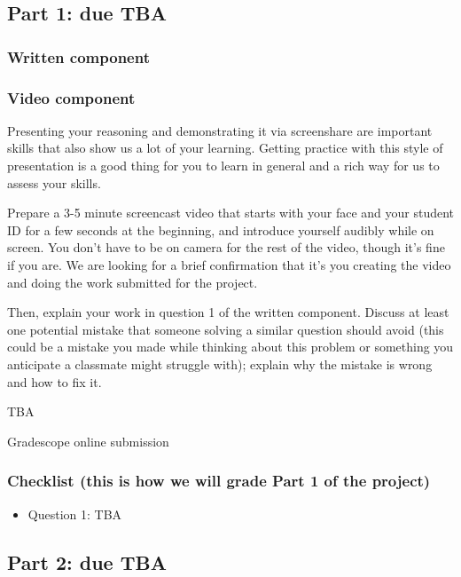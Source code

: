 \newpage
\subsection*{Part 1: due TBA}
\subsubsection*{Written component}


\subsubsection*{Video component}
Presenting your reasoning and demonstrating it via screenshare are important 
skills that also show us a lot of your learning. Getting practice with this style of 
presentation is a good thing for you to learn in general and a rich way for us to assess your skills. 

Prepare a 3-5 minute screencast video that starts with 
your face and your student ID for a few seconds at the beginning, and introduce yourself audibly while on screen. 
You don't have to be on camera for the rest of the video, though it's fine if you are. 
We are looking for a brief confirmation that it's you creating the video and doing the work 
submitted for the project.

Then, explain your work in question 1 of the written component.
Discuss at least one potential mistake that someone solving 
a similar question should avoid (this could be a mistake you made while thinking about this 
problem or something you anticipate a classmate might struggle with); explain why the 
mistake is wrong and how to fix it.
 
TBA

Gradescope online submission

\subsubsection*{Checklist (this is how we will grade Part 1 of the project)}
\begin{itemize}
\item Question 1: TBA
\end{itemize}

\newpage
\subsection*{Part 2: due TBA}
